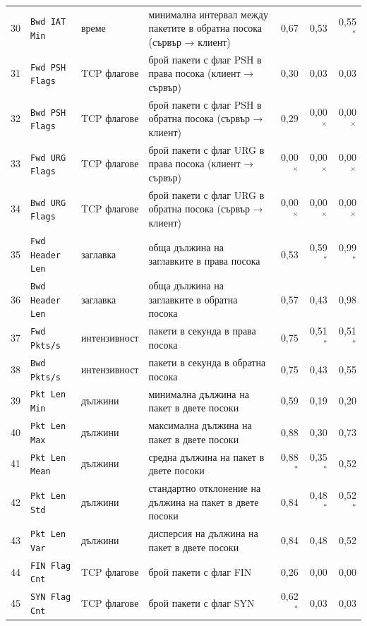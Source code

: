 {{\begin{tabularx}{\textwidth}{@{}rl l Lrrr@{}}
30 & \texttt{Bwd IAT Min} & време & минимална интервал между пакетите в обратна посока (сървър → клиент) & 0,67 & 0,53 & 0,55$^{\ast}$\\
31 & \texttt{Fwd PSH Flags} & TCP флагове & брой пакети с флаг PSH в права посока (клиент → сървър) & 0,30 & 0,03 & 0,03\\
32 & \texttt{Bwd PSH Flags} & TCP флагове & брой пакети с флаг PSH в обратна посока (сървър → клиент) & 0,29 & 0,00$^{\times}$ & 0,00$^{\times}$\\
33 & \texttt{Fwd URG Flags} & TCP флагове & брой пакети с флаг URG в права посока (клиент → сървър) & 0,00$^{\times}$ & 0,00$^{\times}$ & 0,00$^{\times}$\\
34 & \texttt{Bwd URG Flags} & TCP флагове & брой пакети с флаг URG в обратна посока (сървър → клиент) & 0,00$^{\times}$ & 0,00$^{\times}$ & 0,00$^{\times}$\\
35 & \texttt{Fwd Header Len} & заглавка & обща дължина на заглавките в права посока & 0,53 & 0,59$^{\ast}$ & 0,99$^{\ast}$\\
36 & \texttt{Bwd Header Len} & заглавка & обща дължина на заглавките в обратна посока & 0,57 & 0,43 & 0,98\\
37 & \texttt{Fwd Pkts/s} & интензивност & пакети в секунда в права посока & 0,75 & 0,51$^{\ast}$ & 0,51$^{\ast}$\\
38 & \texttt{Bwd Pkts/s} & интензивност & пакети в секунда в обратна посока & 0,75 & 0,43 & 0,55\\
39 & \texttt{Pkt Len Min} & дължини & минимална дължина на пакет в двете посоки & 0,59 & 0,19 & 0,20\\
40 & \texttt{Pkt Len Max} & дължини & максимална дължина на пакет в двете посоки & 0,88 & 0,30 & 0,73\\
41 & \texttt{Pkt Len Mean} & дължини & средна дължина на пакет в двете посоки & 0,88$^{\ast}$ & 0,35$^{\ast}$ & 0,52\\
42 & \texttt{Pkt Len Std} & дължини & стандартно отклонение на дължина на пакет в двете посоки & 0,84 & 0,48$^{\ast}$ & 0,52$^{\ast}$\\
43 & \texttt{Pkt Len Var} & дължини & дисперсия на дължина на пакет в двете посоки & 0,84 & 0,48 & 0,52\\
44 & \texttt{FIN Flag Cnt} & TCP флагове & брой пакети с флаг FIN & 0,26 & 0,00 & 0,00\\
45 & \texttt{SYN Flag Cnt} & TCP флагове & брой пакети с флаг SYN & 0,62$^{\ast}$ & 0,03 & 0,03\\

\end{tabularx}}}
